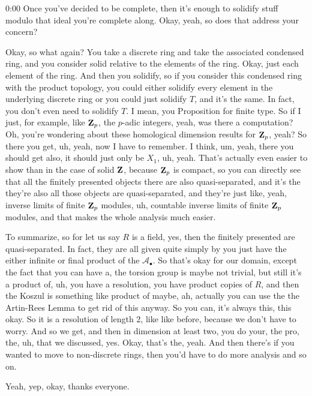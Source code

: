 \begin{unfinished}{0:00}
Once you've decided to be complete, then it's enough to solidify stuff modulo that ideal you're complete along. Okay, yeah, so does that address your concern?

Okay, so what again? You take a discrete ring and take the associated condensed ring, and you consider solid relative to the elements of the ring. Okay, just each element of the ring. And then you solidify, so if you consider this condensed ring with the product topology, you could either solidify every element in the underlying discrete ring or you could just solidify $T$, and it's the same. In fact, you don't even need to solidify $T$. I mean, you
Proposition for finite type. So if I just, for example, like $\mathbf Z_p$, the $p$-adic integers, yeah, was there a computation? Oh, you're wondering about these homological dimension results for $\mathbf Z_p$, yeah? So there you get, uh, yeah, now I have to remember. I think, um, yeah, there you should get also, it should just only be $X_1$, uh, yeah. That's actually even easier to show than in the case of solid $\mathbf Z$, because $\mathbf Z_p$ is compact, so you can directly see that all the finitely presented objects there are also quasi-separated, and it's the they're also all those objects are quasi-separated, and they're just like, yeah, inverse limits of finite $\mathbf Z_p$ modules, uh, countable inverse limits of finite $\mathbf Z_p$ modules, and that makes the whole analysis much easier.

To summarize, so for let us say $R$ is a field, yes, then the finitely presented are quasi-separated. In fact, they are all given quite simply by you just have the either infinite or final product of the $\mathcal{A}_\bullet$. So that's okay for our domain, except the fact that you can have a, the torsion group is maybe not trivial, but still it's a product of, uh, you have a resolution, you have product copies of $R$, and then the Koszul is something like product of maybe, ah, actually you can use the the Artin-Rees Lemma to get rid of this anyway. So you can, it's always this, this okay. So it is a resolution of length 2, like like before, because we don't have to worry. And so we get, and then in dimension at least two, you do your, the pro, the, uh, that we discussed, yes. Okay, that's the, yeah. And then there's if you wanted to move to non-discrete rings, then you'd have to do more analysis and so on.

Yeah, yep, okay, thanks everyone.

\end{unfinished}